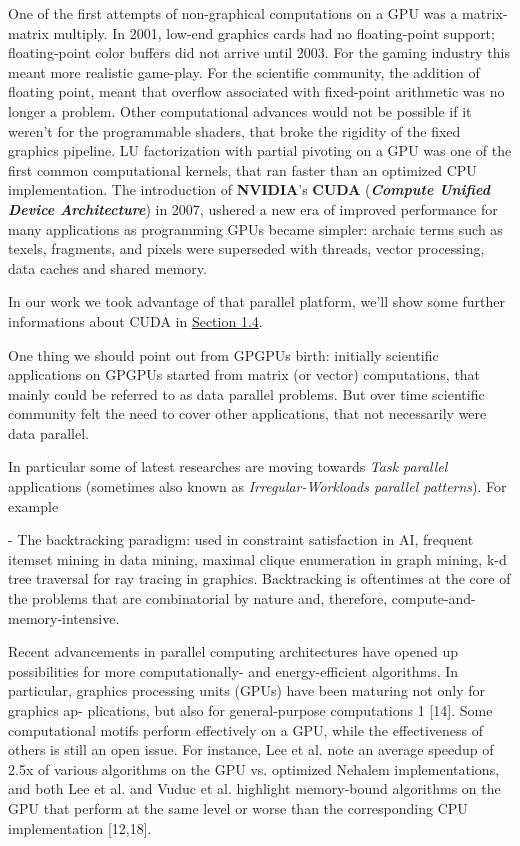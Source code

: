		
		One of the first attempts of non-graphical computations on a GPU was a matrix-matrix multiply. In 2001, low-end graphics cards had no floating-point support; floating-point color buffers did not arrive until 2003. For the gaming industry this meant more realistic game-play. For the scientific community, the addition of floating point, meant that overflow associated with fixed-point arithmetic was no longer a problem. 
		Other computational advances would not be possible if it weren't for the programmable shaders, that broke the rigidity of the fixed graphics pipeline. 
		LU factorization with partial pivoting on a GPU was one of the first common computational kernels, that ran faster than an optimized CPU implementation.
		The introduction of \textbf{NVIDIA}’s \textbf{CUDA} (\textbf{\textit{Compute Unified Device Architecture}}) in 2007, ushered a new era of improved performance for many applications as programming GPUs became simpler: archaic terms such as texels, fragments, and pixels were superseded with threads, vector processing, data caches and shared memory. 
		\cite{fromCUtoOCL}
		
		In our work we took advantage of that parallel platform, we'll show some further informations about CUDA in \hyperref[sect:tools]{Section 1.4}. 
		
		One thing we should point out from GPGPUs birth: initially scientific applications on GPGPUs started from matrix (or vector) computations, that mainly could be referred to as data parallel problems.
		But over time scientific community felt the need to cover other applications, that not necessarily were data parallel.
		
		In particular some of latest researches are moving towards \textit{Task parallel} applications (sometimes also known as \textit{Irregular-Workloads parallel patterns}).
		For example 
		
		
		
		
		
		
		- The backtracking paradigm: used in constraint satisfaction in AI, frequent itemset mining in data mining, maximal clique enumeration in graph mining, k-d tree traversal for ray tracing in graphics. Backtracking is oftentimes at the core of the problems that are combinatorial by nature and, therefore, compute-and-memory-intensive. 
		
		Recent advancements in parallel computing architectures have opened up possibilities for more computationally- and energy-efficient algorithms. In particular,
		graphics processing units (GPUs) have been maturing not only for graphics ap-
		plications, but also for general-purpose computations 1 [14]. Some computational
		motifs perform effectively on a GPU, while the effectiveness of others is still an
		open issue. For instance, Lee et al. note an average speedup of 2.5x of various
		algorithms on the GPU vs. optimized Nehalem implementations, and both Lee
		et al. and Vuduc et al. highlight memory-bound algorithms on the GPU that
		perform at the same level or worse than the corresponding CPU implementation [12,18].
		
